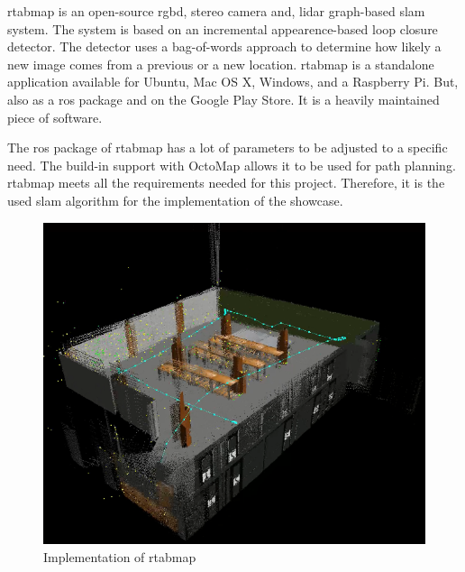 \acs{rtabmap} is an open\hyp{}source \acs{rgbd}, stereo camera and, \acs{lidar} graph\hyp{}based \acs{slam} system. The system is based on an incremental appearence\hyp{}based loop closure detector. The detector uses a bag\hyp{}of\hyp{}words approach to determine how likely a new image comes from a previous or a new location. \acs{rtabmap} is a standalone application available for Ubuntu, Mac OS X, Windows, and a Raspberry Pi. But, also as a \acs{ros} package and on the Google Play Store. It is a heavily maintained piece of software. \cite{rtabmap_introlab}

The \acs{ros} package of \acs{rtabmap} has a lot of parameters to be adjusted to a specific need. The build\hyp{}in support with OctoMap allows it to be used for path planning. \acs{rtabmap} meets all the requirements needed for this project. Therefore, it is the used \acs{slam} algorithm for the implementation of the showcase.

\begin{figure}[!h]
  \centering
  \includegraphics[width=\linewidth]{images/rtabmap_implementation.png}
  \caption{Implementation of \acs{rtabmap}}
  \label{fig:rtabmap_implementation}
\end{figure}